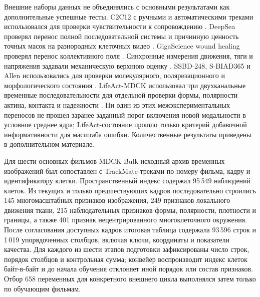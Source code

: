 \documentclass[11pt,a4paper]{article}
\begin{document}
Внешние наборы данных не объединялись с основными результатами как дополнительные успешные тесты. C2C12 с ручными и автоматическими треками использовался для проверки чувствительности к сопровождению \cite{ref22}. DeepSea проверял перенос полной последовательной системы и причинную ценность точных масок на разнородных клеточных видео \cite{ref33}. GigaScience wound healing проверял перенос коллективного поля \cite{ref23}. Синхронные измерения движения, тяги и напряжения задавали механическую верхнюю оценку \cite{ref24}. SSBD-248, S-BIAD365 и Allen использовались для проверки молекулярного, поляризационного и морфологического состояния \cite{ref25,ref26,ref27,ref28}. LifeAct-MDCK использовал три двухканальные временные последовательности для отдельной проверки формы, полярности актина, контакта и надежности \cite{ref34}. Ни один из этих межэкспериментальных переносов не прошел заранее заданный порог включения новой модальности в условное среднее ядра; LifeAct-состояние прошло только критерий добавочной информативности для масштаба ошибки. Количественные результаты приведены в дополнительном материале.

Для шести основных фильмов MDCK Bulk исходный архив временных изображений был сопоставлен с TrackMate-треками по номеру фильма, кадру и идентификатору клетки. Пространственный индекс содержал 95\,549 наблюдений клеток. Из текущих и только предшествующих кадров последовательно строились 145 многомасштабных признаков изображения, 249 признаков локального движения ткани, 215 наблюдательных признаков формы, полярности, плотности и границы, а также 401 признак нецентрированного многоклеточного окружения. После согласования доступных кадров итоговая таблица содержала 93\,596 строк и 1\,019 упорядоченных столбцов, включая ключи, координаты и показатели качества. Для каждого из шести этапов подготовки зафиксированы число строк, порядок столбцов и контрольная сумма; конвейер воспроизводит индекс клеток байт-в-байт и до начала обучения отклоняет иной порядок или состав признаков. Отбор 658 переменных для конкретного внешнего цикла выполнялся затем только по обучающим фильмам.
\end{document}
